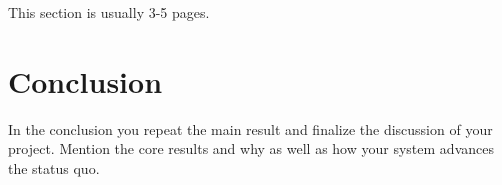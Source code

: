 \documentclass[a4paper,11pt,oneside]{report}
\begin{document}
This section is usually 3-5 pages.


\chapter{Conclusion}

In the conclusion you repeat the main result and finalize the discussion of
your project. Mention the core results and why as well as how your system
advances the status quo.

\cleardoublepage
{}
{}
\printbibliography

%
%
\end{document}
